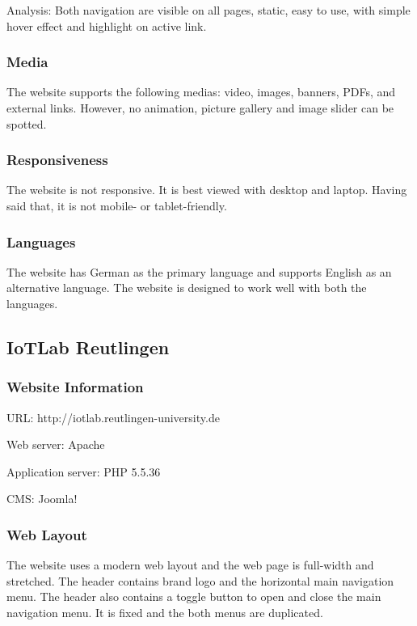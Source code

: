 Analysis: Both navigation are visible on all pages, static, easy to use, with simple hover effect and highlight on active link.

\subsubsection*{Media}
The website supports the following medias: video, images, banners, PDFs, and external links. However, no animation, picture gallery and image slider can be spotted.

\subsubsection*{Responsiveness}
The website is not responsive. It is best viewed with desktop and laptop. Having said that, it is not mobile- or tablet-friendly.

\subsubsection*{Languages}
The website has German as the primary language and supports English as an alternative language. The website is designed to work well with both the languages.

\subsection{IoTLab Reutlingen}
\subsubsection*{Website Information}
\begin{itemize*}
\item URL: http://iotlab.reutlingen-university.de
\item Web server: Apache
\item Application server: PHP 5.5.36
\item CMS: Joomla!
\end{itemize*}

\subsubsection*{Web Layout}
The website \cite{Prof.Dr.Ing.habil.Nativi.2016} uses a modern web layout and the web page is full-width and stretched. The header contains brand logo and the horizontal main navigation menu. The header also contains a toggle button to open and close the main navigation menu. It is fixed and the both menus are duplicated.

